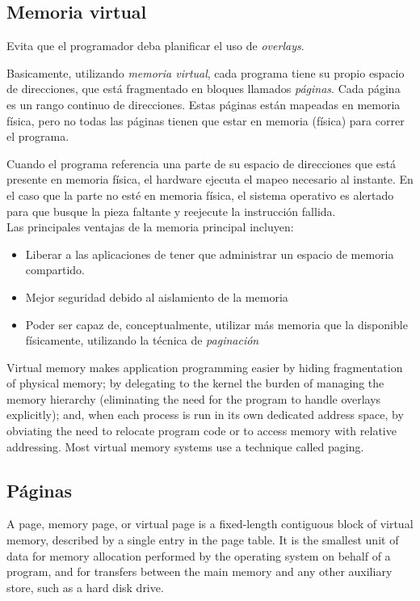 \documentclass[a4paper, twoside]{article}
\begin{document}
\subsection{Memoria virtual}
Evita que el programador deba planificar el uso de \emph{overlays}.

Basicamente, utilizando \emph{memoria virtual}, cada programa tiene su propio espacio de direcciones, que está fragmentado en bloques llamados \emph{páginas}. Cada página es un rango continuo de direcciones. Estas páginas están mapeadas en memoria física, pero no todas las páginas tienen que estar en memoria (física) para correr el programa.

Cuando el programa referencia una parte de su espacio de direcciones que está presente en memoria física, el hardware ejecuta el mapeo necesario al instante. En el caso que la parte no esté en memoria física, el sistema operativo es alertado para que busque la pieza faltante y reejecute la instrucción fallida.\\

Las principales ventajas de la memoria principal incluyen:
\begin{itemize}
	\item Liberar a las aplicaciones de tener que administrar un espacio de memoria compartido.
	\item Mejor seguridad debido al aislamiento de la memoria
	\item Poder ser capaz de, conceptualmente, utilizar más memoria que la disponible físicamente, utilizando la técnica de \emph{paginación}
\end{itemize}
Virtual memory makes application programming easier by hiding fragmentation of physical memory; by delegating to the kernel the burden of managing the memory hierarchy (eliminating the need for the program to handle overlays explicitly); and, when each process is run in its own dedicated address space, by obviating the need to relocate program code or to access memory with relative addressing.
Most virtual memory systems use a technique called paging.

\subsection{Páginas}
A page, memory page, or virtual page is a fixed-length contiguous block of virtual memory, described by a single entry in the page table. It is the smallest unit of data for memory allocation performed by the operating system on behalf of a program, and for transfers between the main memory and any other auxiliary store, such as a hard disk drive.
\end{document}
